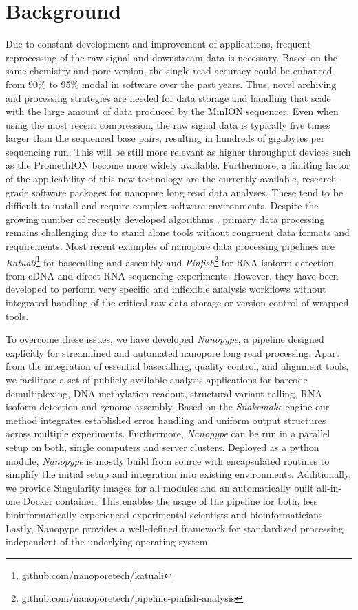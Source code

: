 \section{Background}
\label{sec:nanopype:background}

Due to constant development and improvement of applications, frequent reprocessing of the raw signal and downstream data is necessary. Based on the same chemistry and pore version, the single read accuracy could be enhanced from 90\% to 95\% modal in software over the past years. Thus, novel archiving and processing strategies are needed for data storage and handling that scale with the large amount of data produced by the MinION sequencer. Even when using the most recent compression, the raw signal data is typically five times larger than the sequenced base pairs, resulting in hundreds of gigabytes per sequencing run. This will be still more relevant as higher throughput devices such as the PromethION become more widely available. Furthermore, a limiting factor of the applicability of this new technology are the currently available, research-grade software packages for nanopore long read data analyses. These tend to be difficult to install and require complex software environments. Despite the growing number of recently developed algorithms \cite{Magi2018}, primary data processing remains challenging due to stand alone tools without congruent data formats and requirements. 
Most recent examples of nanopore data processing pipelines are \textit{Katuali}\footnote{github.com/nanoporetech/katuali} for basecalling and assembly and \textit{Pinfish}\footnote{github.com/nanoporetech/pipeline-pinfish-analysis} for RNA isoform detection from cDNA and direct RNA sequencing experiments. However, they have been developed to perform very specific and inflexible analysis workflows without integrated handling of the critical raw data storage or version control of wrapped tools.

To overcome these issues, we have developed \textit{Nanopype}, a pipeline designed explicitly for streamlined and automated nanopore long read processing. Apart from the integration of essential basecalling, quality control, and alignment tools, we facilitate a set of publicly available analysis applications for barcode demultiplexing, DNA methylation readout, structural variant calling, RNA isoform detection and genome assembly. 
Based on the \textit{Snakemake} engine \cite{Koester2012} our method integrates established error handling and uniform output structures across multiple experiments. Furthermore, \textit{Nanopype} can be run in a parallel setup on both, single computers and server clusters. Deployed as a python module, \textit{Nanopype} is mostly build from source with encapsulated routines to simplify the initial setup and integration into existing environments. Additionally, we provide Singularity images for all modules and an automatically built all-in-one Docker container. This enables the usage of the pipeline for both, less bioinformatically experienced experimental scientists and bioinformaticians. Lastly, Nanopype provides a well-defined framework for standardized processing independent of the underlying operating system.




